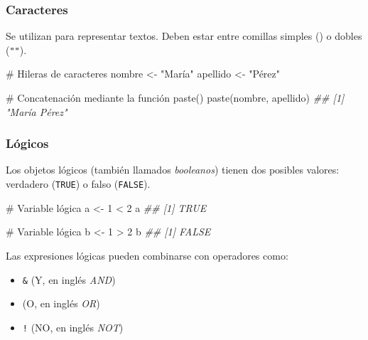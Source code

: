 \documentclass[
  letterpaper,
  DIV=11,
  numbers=noendperiod]{scrreprt}
\newenvironment{Shaded}{\begin{snugshade}}{\end{snugshade}}
\newcommand{\CommentTok}[1]{\textcolor[rgb]{0.37,0.37,0.37}{#1}}
\newcommand{\DecValTok}[1]{\textcolor[rgb]{0.68,0.00,0.00}{#1}}
\newcommand{\DocumentationTok}[1]{\textcolor[rgb]{0.37,0.37,0.37}{\textit{#1}}}
\newcommand{\FunctionTok}[1]{\textcolor[rgb]{0.28,0.35,0.67}{#1}}
\newcommand{\NormalTok}[1]{\textcolor[rgb]{0.00,0.23,0.31}{#1}}
\newcommand{\OtherTok}[1]{\textcolor[rgb]{0.00,0.23,0.31}{#1}}
\newcommand{\SpecialCharTok}[1]{\textcolor[rgb]{0.37,0.37,0.37}{#1}}
\newcommand{\StringTok}[1]{\textcolor[rgb]{0.13,0.47,0.30}{#1}}
\providecommand{\tightlist}{%
  \setlength{\itemsep}{0pt}\setlength{\parskip}{0pt}}\usepackage{longtable,booktabs,array}
\begin{document}
\hypertarget{caracteres}{%
\subsubsection{Caracteres}\label{caracteres}}

Se utilizan para representar textos. Deben estar entre comillas simples
(\texttt{\textquotesingle{}\textquotesingle{}}) o dobles (\texttt{""}).

\begin{Shaded}
\begin{Highlighting}[]
\CommentTok{\# Hileras de caracteres}
\NormalTok{nombre }\OtherTok{\textless{}{-}} \StringTok{"María"}
\NormalTok{apellido }\OtherTok{\textless{}{-}} \StringTok{"Pérez"}

\CommentTok{\# Concatenación mediante la función paste()}
\FunctionTok{paste}\NormalTok{(nombre, apellido)}
\DocumentationTok{\#\# [1] "María Pérez"}
\end{Highlighting}
\end{Shaded}

\hypertarget{luxf3gicos}{%
\subsubsection{Lógicos}\label{luxf3gicos}}

Los objetos lógicos (también llamados \emph{booleanos}) tienen dos
posibles valores: verdadero (\texttt{TRUE}) o falso (\texttt{FALSE}).

\begin{Shaded}
\begin{Highlighting}[]
\CommentTok{\# Variable lógica}
\NormalTok{a }\OtherTok{\textless{}{-}} \DecValTok{1} \SpecialCharTok{\textless{}} \DecValTok{2}
\NormalTok{a}
\DocumentationTok{\#\# [1] TRUE}

\CommentTok{\# Variable lógica}
\NormalTok{b }\OtherTok{\textless{}{-}} \DecValTok{1} \SpecialCharTok{\textgreater{}} \DecValTok{2}
\NormalTok{b}
\DocumentationTok{\#\# [1] FALSE}
\end{Highlighting}
\end{Shaded}

Las expresiones lógicas pueden combinarse con operadores como:

\begin{itemize}
\tightlist
\item
  \texttt{\&} (Y, en inglés \emph{AND})
\item
  \texttt{\textbar{}} (O, en inglés \emph{OR})
\item
  \texttt{!} (NO, en inglés \emph{NOT})
\end{itemize}
\end{document}
